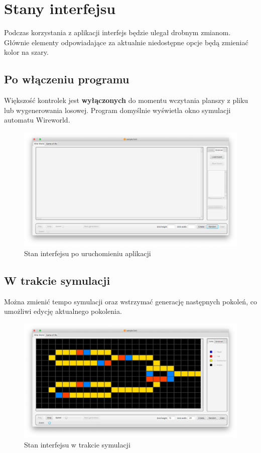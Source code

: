 \documentclass{report}
\begin{document}
\section{Stany interfejsu}
Podczas korzystania z aplikacji interfejs będzie ulegał drobnym zmianom. Głównie elementy odpowiadające za aktualnie niedostępne opcje będą zmieniać kolor na szary.

\subsection{Po włączeniu programu}
Większość kontrolek jest \textbf{wyłączonych} do momentu wczytania planszy z pliku lub wygenerowania losowej. Program domyślnie wyświetla okno symulacji automatu Wireworld.

\begin{figure}[H]
    \centering
    \includegraphics[width=\textwidth]{gui-initial}
    \caption{Stan interfejsu po uruchomieniu aplikacji}
\end{figure}

\subsection{W trakcie symulacji}
Można zmienić tempo symulacji oraz wstrzymać generację następnych pokoleń, co umożliwi edycję aktualnego pokolenia.

\begin{figure}[H]
    \centering
    \includegraphics[width=\textwidth]{gui-running}
    \caption{Stan interfejsu w trakcie symulacji}
\end{figure}
\end{document}
